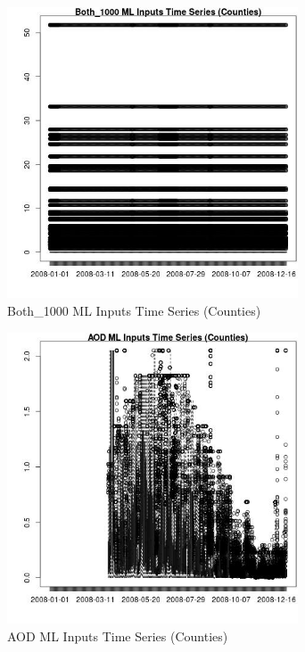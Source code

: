 \begin{figure} 
\centering  
\includegraphics[width=0.77\textwidth]{Code_Outputs/ML_input_report_ML_input_CountyGeometricCentroids_Locations_Dates_part_c_2008-01-01to2008-12-31_Both_1000TS.jpg} 
\caption{\label{fig:ML_input_report_ML_input_CountyGeometricCentroids_Locations_Dates_part_c_2008-01-01to2008-12-31Both_1000TS}Both_1000 ML Inputs Time Series (Counties)} 
\end{figure} 
 

\begin{figure} 
\centering  
\includegraphics[width=0.77\textwidth]{Code_Outputs/ML_input_report_ML_input_CountyGeometricCentroids_Locations_Dates_part_c_2008-01-01to2008-12-31_AODTS.jpg} 
\caption{\label{fig:ML_input_report_ML_input_CountyGeometricCentroids_Locations_Dates_part_c_2008-01-01to2008-12-31AODTS}AOD ML Inputs Time Series (Counties)} 
\end{figure} 
 

